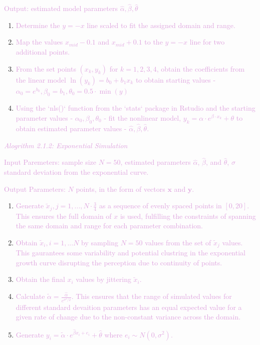 \documentclass[]{interact}
\theoremstyle{plain}%
\theoremstyle{definition}
\theoremstyle{remark}
\begin{document}
\textcolor{Plum}{Output: estimated model parameters $\hat\alpha, \hat\beta, \hat\theta$}

\begin{enumerate}
\def\labelenumi{\arabic{enumi}.}
\item
  \textcolor{Plum}{Determine the $y=-x$ line scaled to fit the assigned domain and range.}
\item
  \textcolor{Plum}{Map the values $x_{mid} - 0.1$ and $x_{mid} + 0.1$ to the $y=-x$ line for two additional points.}
\item
  \textcolor{Plum}{From the set points $(x_k, y_k)$ for $k = 1,2,3,4$, obtain the coefficients from the linear model $\ln(y_k) = b_0 +b_1x_k$ to obtain starting values - $\alpha_0 = e^{b_0}, \beta_0 =  b_1, \theta_0 = 0.5\cdot \min(y)$}
\item
  \textcolor{Plum}{Using the `nls()` function from the `stats` package in Rstudio and the starting parameter values - $\alpha_0, \beta_0, \theta_0$ - fit the nonlinear model, $y_k = \alpha\cdot e^{\beta\cdot x_k}+\theta$ to obtain estimated parameter values - $\hat\alpha, \hat\beta, \hat\theta.$}
\end{enumerate}

\textcolor{Plum}{\textit{Alogrithm 2.1.2: Exponential Simulation}}

\textcolor{Plum}{Input Paremeters: sample size $N = 50$, estimated parameters $\hat\alpha$, $\hat\beta$, and $\hat\theta$, $\sigma$ standard deviation from the exponential curve.}

\textcolor{Plum}{Output Parameters: $N$ points, in the form of vectors $\mathbf{x}$ and $\mathbf{y}$.}

\begin{enumerate}
\def\labelenumi{\arabic{enumi}.}
\item
  \textcolor{Plum}{Generate $\tilde x_j, j = 1,..., N\cdot \frac{3}{4}$ as a sequence of evenly spaced points in $[0,20]$. This ensures the full domain of $x$ is used, fulfilling the constraints of spanning the same domain and range for each parameter combination.}
\item
  \textcolor{Plum}{Obtain $\tilde x_i, i = 1,...N$ by sampling $N = 50$ values from the set of $\tilde x_j$ values. This gaurantees some variability and potential clustring in the exponential growth curve disrupting the perception due to continuity of points.}
\item
  \textcolor{Plum}{Obtain the final $x_i$ values by jittering $\tilde x_i$.}
\item
  \textcolor{Plum}{Calculate $\tilde\alpha = \frac{\hat\alpha}{e^{\sigma^2/2}}.$ This ensures that the range of simulated values for different standard devaition parameters has an equal expected value for a given rate of change due to the non-constant variance across the domain.}
\item
  \textcolor{Plum}{Generate $y_i = \tilde\alpha\cdot e^{\hat\beta x_i + e_i}+\hat\theta$ where $e_i\sim N(0,\sigma^2).$}
\end{enumerate}
\end{document}
